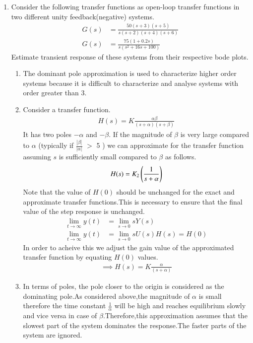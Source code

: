 \begin{enumerate}[label=\thesubsection.\arabic*.,ref=\thesubsection.\theenumi]

\item Consider the following transfer functions as open-loop transfer functions in two different unity feedback(negative) systems.
\begin{align}
G(s) &= \frac{50(s+3)(s+5)}{s(s+2)(s+4)(s+6)} 
\\
G(s) &= \frac{75(1+0.2s)}{s(s^{2}+16s+100)} 
\end{align}
Estimate transient response of these systems from their respective bode plots.
\\
\solution 
\begin{enumerate}
\item  The dominant pole approximation is used to characterize higher order systems because it is difficult to characterize and analyse systems with order greater than 3.
\item Consider a transfer function.
\begin{align}
H(s) = K\frac{\alpha\beta}{(s+\alpha)(s+\beta)}
\end{align}
It has two poles $-\alpha$ and $-\beta $. If the magnitude of $\beta$ is very large compared to $\alpha$ (typically if $\frac{|\beta|}{|\alpha|}$ $>$ 5  ) we can approximate for the transfer function assuming $s$ is sufficiently small compared to $\beta$ as follows.
\begin{align}
H(s) = K_{2}\left(\frac{1}{s+\alpha}\right)
\end{align}
Note that the value of $H(0)$ should be unchanged for the exact and approximate transfer functions.This is necessary to ensure that the final value of the step response is unchanged.
\begin{align}
\lim_{t\to\infty} y(t) &= \lim_{s\to 0} sY(s) \\
\lim_{t\to\infty} y(t) &= \lim_{s\to 0} sU(s)H(s) = H(0)
\end{align}
In order to acheive this we adjust the gain value of the approximated transfer function by equating $H(0)$ values.
\begin{align}
\implies H(s) = K\frac{\alpha}{(s+\alpha)}
\end{align}
\item In terms of poles, the pole closer to the origin is considered as the dominating pole.As considered above,the magnitude of $\alpha$ is small therefore the time constant $\frac{1}{\alpha}$ will be high and reaches equilibrium slowly and vice versa in case of  $\beta$.Therefore,this approximation assumes that the slowest part of the system dominates the response.The faster parts of the system are ignored.

\end{enumerate}
\end{enumerate}
